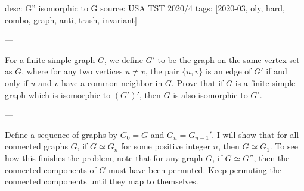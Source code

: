 desc: G'' isomorphic to G
source: USA TST 2020/4
tags: [2020-03, oly, hard, combo, graph, anti, trash, invariant]

---

For a finite simple%
graph $G$, we define $G'$ to be the graph on the same vertex set as $G$, where for any two vertices $u\ne v$, the pair $\{u,v\}$ is an edge of $G'$ if and only if $u$ and $v$ have a common neighbor in $G$. Prove that if $G$ is a finite simple graph which is isomorphic to $(G')'$, then $G$ is also isomorphic to $G'$.

---

Define a sequence of graphs by $G_0=G$ and $G_n=G_{n-1}'$. I will show that for all connected graphs $G$, if $G\simeq G_n$ for some positive integer $n$, then $G\simeq G_1$. To see how this finishes the problem, note that for any graph $G$, if $G\simeq G''$, then the connected components of $G$ must have been permuted. Keep permuting the connected components until they map to themselves.

